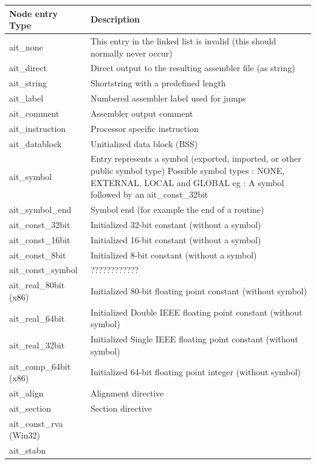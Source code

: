 \documentclass [a4paper,12pt]{article}
\begin{document}
\begin{longtable}{|l|p{10cm}|}
\hline
Node entry Type   & Description \\
\hline
\endhead
\hline
\endfoot
ait{\_}none&
    This entry in the linked list is invalid (this should
    normally never occur) \\
ait{\_}direct&
    Direct output to the resulting assembler file (as string) \\
ait{\_}string&
    Shortstring with a predefined length \\
ait{\_}label&
    Numbered assembler label used for jumps \\
ait{\_}comment&
    Assembler output comment \\
ait{\_}instruction&
    Processor specific instruction \\
ait{\_}datablock&
    Unitialized data block (BSS) \\
ait{\_}symbol&
    Entry represents a symbol (exported, imported, or other public
    symbol type) \newline
    Possible symbol types : NONE, EXTERNAL, LOCAL and GLOBAL \newline
    eg : A symbol followed by an ait{\_}const{\_}32bit \\
ait{\_}symbol{\_}end &
    Symbol end (for example the end of a routine) \\
ait{\_}const{\_}32bit&
    Initialized 32-bit constant (without a symbol) \\
ait{\_}const{\_}16bit&
    Initialized 16-bit constant (without a symbol) \\
ait{\_}const{\_}8bit&
    Initialized 8-bit constant (without a symbol) \\
ait{\_}const{\_}symbol & ???????????? \\
ait{\_}real{\_}80bit (x86)&
    Initialized 80-bit floating point constant (without symbol) \\
ait{\_}real{\_}64bit&
    Initialized Double IEEE floating point constant (without symbol) \\
ait{\_}real{\_}32bit&
    Initialized Single IEEE floating point constant (without symbol) \\
ait{\_}comp{\_}64bit (x86)&
    Initialized 64-bit floating point integer (without symbol) \\
ait{\_}align&
    Alignment directive \\
ait{\_}section&
    Section directive \\
ait{\_}const{\_}rva (Win32)&  \\
ait{\_}stabn &

\end{longtable}
\end{document}
